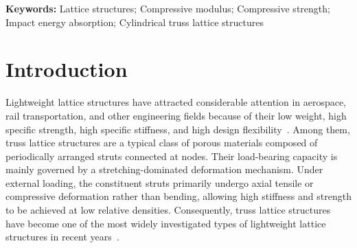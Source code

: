 \documentclass[12pt,a4paper]{article}
\begin{document}
	\noindent\textbf{Keywords:} Lattice structures; Compressive modulus; Compressive strength; Impact energy absorption; Cylindrical truss lattice structures
		
	
	\section{Introduction}
	
	Lightweight lattice structures have attracted considerable attention in aerospace, rail transportation, and other engineering fields because of their low weight, high specific strength, high specific stiffness, and high design flexibility~\cite{Ref1,Ref2,Ref3,Ref4,Ref5,Ref6,Ref7,Ref8,Ref9,Ref10}. Among them, truss lattice structures are a typical class of porous materials composed of periodically arranged struts connected at nodes. Their load-bearing capacity is mainly governed by a stretching-dominated deformation mechanism. Under external loading, the constituent struts primarily undergo axial tensile or compressive deformation rather than bending, allowing high stiffness and strength to be achieved at low relative densities. Consequently, truss lattice structures have become one of the most widely investigated types of lightweight lattice structures in recent years~\cite{Ref11}.
	
\end{document}
